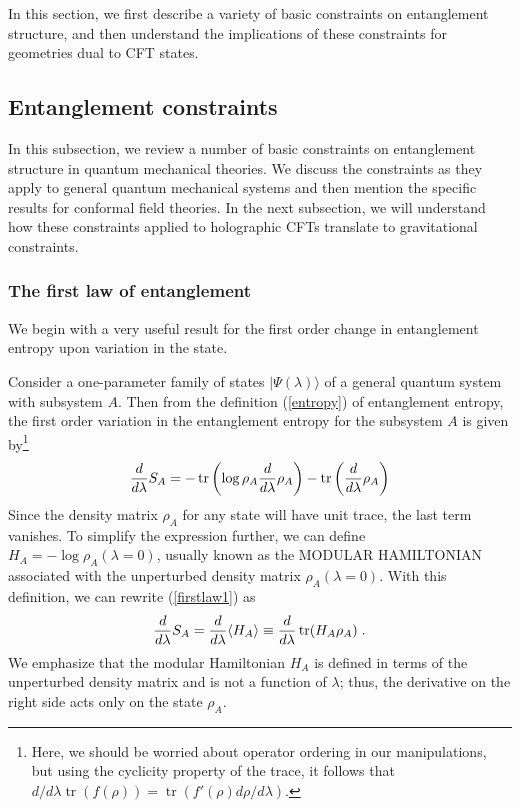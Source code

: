 \documentclass[12pt,epsf]{article}
\newcommand{\be}{\begin{equation}}
\newcommand{\ee}{\end{equation}}
\newcommand{\tr}{\operatorname{tr}}
\begin{document}
In this section, we first describe a variety of basic constraints on entanglement structure, and then understand the implications of these constraints for geometries dual to CFT states.

\subsection{Entanglement constraints}

In this subsection, we review a number of basic constraints on entanglement structure in quantum mechanical theories. We discuss the constraints as they apply to general quantum mechanical systems and then mention the specific results for conformal field theories.  In the next subsection, we will understand how these constraints applied to holographic CFTs translate to gravitational constraints.

\subsubsection*{The first law of entanglement}

We begin with a very useful result for the first order change in entanglement entropy upon variation in the state.

Consider a one-parameter family of states $|\Psi(\lambda) \rangle$ of a general quantum system with subsystem $A$. Then from the definition (\ref{entropy}) of entanglement entropy, the first order variation in the entanglement entropy for the subsystem $A$ is given by\footnote{Here, we should be worried about operator ordering in our manipulations, but using the cyclicity property of the trace, it follows that $d/d \lambda\tr(f(\rho)) = \tr(f'(\rho)d \rho / d \lambda)$.}
\be
\label{firstlaw1}
{d \over d \lambda} S_A = -\tr \left( \log \rho_A {d \over d \lambda} \rho_A  \right)  -\tr \left( {d \over d \lambda} \rho_A \right)
\ee
Since the density matrix $\rho_A$ for any state will have unit trace, the last term vanishes. To simplify the expression further, we can define $H_A = - \log \rho_A(\lambda = 0)$, usually known as the MODULAR HAMILTONIAN associated with the unperturbed density matrix $\rho_A(\lambda = 0)$. With this definition, we can rewrite (\ref{firstlaw1}) as \cite{blanco2013relative}
\be
\label{firstlaw}
{d \over d \lambda} S_A = {d \over d \lambda} \langle H_A \rangle \equiv {d \over d \lambda} \tr( H_A \rho_A) \; .
\ee
We emphasize that the modular Hamiltonian $H_A$ is defined in terms of the unperturbed density matrix and is not a function of $\lambda$; thus, the derivative on the right side acts only on the state $\rho_A$.
\end{document}
